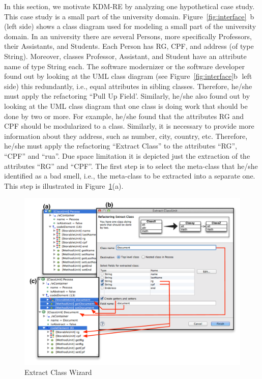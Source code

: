 \documentclass[12pt]{article}
\begin{document}
In this section, we motivate KDM-RE by analyzing  one hypothetical case study. This case study is a small part of the university domain. Figure~\ref{fig:interface}~\textcircled{b} (left side) shows a class diagram used for modeling a small part of the
university domain. In an university there are several Persons, more specifically Professors, their Assistants, and Students. Each Person has RG, CPF, and address (of type String). Moreover, classes Professor, Assistant, and Student have an attribute name of type String each. The software modernizer or the software developer found out by looking at the UML class diagram (see Figure~\ref{fig:interface}\textcircled{b} left side) this redundantly, i.e., equal attributes in sibling classes. Therefore, he/she must apply the refactoring ``Pull Up Field'. Similarly, he/she also found out by looking at the UML class diagram that one class is doing work that should be done by two or more. For example, he/she found that the attributes RG and CPF should be modularized to a class. Similarly, it is necessary to provide more information about they address, such as number, city, country, etc. Therefore, he/she must apply the refactoring ``Extract Class'' to the attributes ``RG'', ``CPF'' and ``rua''. Due space limitation it is depicted just the extraction of the attributes ``RG'' and ``CPF''.  The first step is to select the meta-class that he/she identified as a bad smell, i.e., the meta-class to be extracted into a separate one.  This step is illustrated in Figure~\ref{fig:wizard}(a). 

\begin{figure}[!ht]
\centering
  \includegraphics[scale=0.53]{figure/Wizard2}
\caption{Extract Class Wizard}
\label{fig:wizard}
\end{figure}
\end{document}
